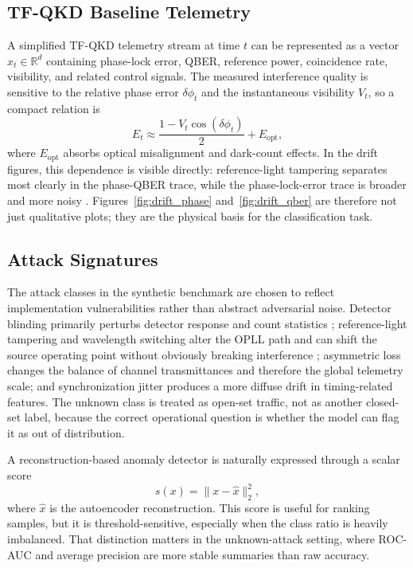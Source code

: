 \subsection{TF-QKD Baseline Telemetry}
A simplified TF-QKD telemetry stream at time $t$ can be represented as a vector $x_t \in \mathbb{R}^d$ containing phase-lock error, QBER, reference power, coincidence rate, visibility, and related control signals. The measured interference quality is sensitive to the relative phase error $\delta \phi_t$ and the instantaneous visibility $V_t$, so a compact relation is
\begin{equation}
E_t \approx \frac{1 - V_t \cos(\delta \phi_t)}{2} + E_{\mathrm{opt}},
\end{equation}
where $E_{\mathrm{opt}}$ absorbs optical misalignment and dark-count effects. In the drift figures, this dependence is visible directly: reference-light tampering separates most clearly in the phase-QBER trace, while the phase-lock-error trace is broader and more noisy \cite{peng}. Figures~\ref{fig:drift_phase} and~\ref{fig:drift_qber} are therefore not just qualitative plots; they are the physical basis for the classification task.

\subsection{Attack Signatures}
The attack classes in the synthetic benchmark are chosen to reflect implementation vulnerabilities rather than abstract adversarial noise. Detector blinding primarily perturbs detector response and count statistics \cite{lydersen, makarov}; reference-light tampering and wavelength switching alter the OPLL path and can shift the source operating point without obviously breaking interference \cite{gisin, li2011, peng}; asymmetric loss changes the balance of channel transmittances and therefore the global telemetry scale; and synchronization jitter produces a more diffuse drift in timing-related features. The unknown class is treated as open-set traffic, not as another closed-set label, because the correct operational question is whether the model can flag it as out of distribution.

A reconstruction-based anomaly detector is naturally expressed through a scalar score
\begin{equation}
s(x) = \lVert x - \hat{x} \rVert_2^2,
\end{equation}
where $\hat{x}$ is the autoencoder reconstruction. This score is useful for ranking samples, but it is threshold-sensitive, especially when the class ratio is heavily imbalanced. That distinction matters in the unknown-attack setting, where ROC-AUC and average precision are more stable summaries than raw accuracy.

